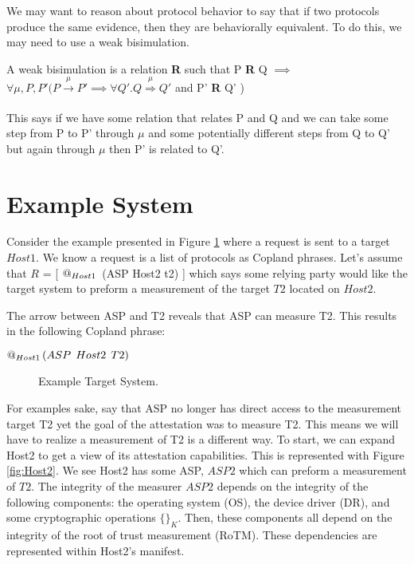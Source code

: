 \documentclass[12pt, letterpaper]{article}
\begin{document}
We may want to reason about protocol behavior to say that if two protocols produce the same evidence, then they are behaviorally equivalent. To do this, we may need to use a weak bisimulation. 

\begin{defn}
A weak bisimulation is a relation \textbf{R} such that P \textbf{R} Q $\implies$ $\forall \mu, P, P' (P \xrightarrow[]{\mu} P' \implies \forall Q'. Q \overset{\mu}\Rightarrow Q'$ and P' \textbf{R} Q' ) \cite{Milner} 
\end{defn}

This says if we have some relation that relates P and Q and we can take some step from P to P' through $\mu$ and some potentially different steps from Q to Q' but again through $\mu$ then P' is related to Q'.  

\section{Example System}

Consider the example presented in Figure \ref{fig:Host1} where a request is sent to a target $Host1$. We know a request is a list of protocols as Copland phrases. Let's assume that $R$ = [ $\mathop{@_{Host1}}{} $ (ASP Host2 t2) ] which says some relying party would like the target system to preform a measurement of the target $T2$ located on $Host2$. 

The arrow between ASP and T2 reveals that ASP can measure T2. This results in the following Copland phrase: 

\begin{center}
  $ \mathop{@_{Host1}}{(}ASP\:\: Host2\:\: T2)$
\end{center}

\begin{figure}[hbtp]
  \centering 
  \caption{Example Target System.}
  \label{fig:Host1}
\end{figure}

For examples sake, say that ASP no longer has direct access to the measurement target T2 yet the goal of the attestation was to measure T2. This means we will have to realize a measurement of T2 is a different way. To start, we can expand Host2 to get a view of its attestation capabilities. This is represented with Figure \ref{fig:Host2}. We see Host2 has some ASP, $ASP2$ which can preform a measurement of $T2$. The integrity of the measurer $ASP2$ depends on the integrity of the following components: the operating system (OS), the device driver (DR), and some cryptographic operations $ \{ \}_{K}$. Then, these components all depend on the integrity of the root of trust measurement (RoTM). These dependencies are represented within Host2's manifest. 
\end{document}
